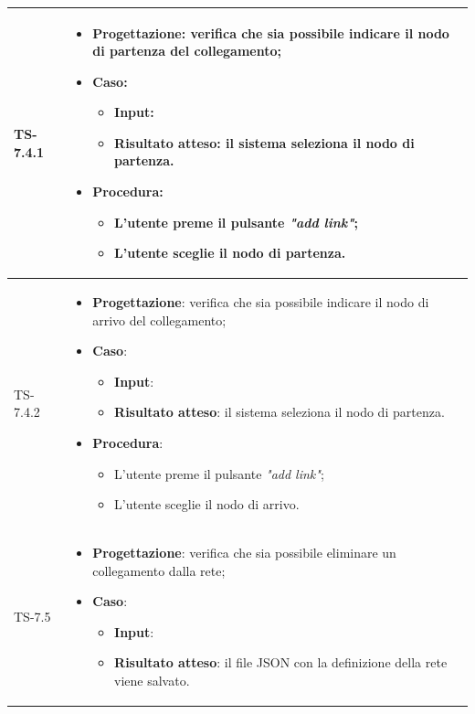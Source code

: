\begin{longtable}{|C{2.5cm}|C{13cm}|}
\hline
	{TS-7.4.1} & 
\begin{itemize}
	\item \textbf{Progettazione}: verifica che sia possibile indicare il nodo
	di partenza del collegamento;
	\item \textbf{Caso}: 
	\begin{itemize}
		\item \textbf{Input}: 
		\item \textbf{Risultato atteso}: il sistema seleziona il nodo di partenza.
	\end{itemize}
	\item \textbf{Procedura}:
	\begin{itemize}
		\item L'utente preme il pulsante \emph{"add link"};
		\item L'utente sceglie il nodo di partenza.
	\end{itemize} 
\end{itemize}
	 \\
	\hline
	{TS-7.4.2} &
\begin{itemize}
	\item \textbf{Progettazione}: verifica che sia possibile indicare il nodo
	di arrivo del collegamento;
	\item \textbf{Caso}: 
	\begin{itemize}
		\item \textbf{Input}: 
		\item \textbf{Risultato atteso}: il sistema seleziona il nodo di partenza.
	\end{itemize}
	\item \textbf{Procedura}:
	\begin{itemize}
		\item L'utente preme il pulsante \emph{"add link"};
		\item L'utente sceglie il nodo di arrivo.
	\end{itemize} 
\end{itemize}
\\
\hline
	{TS-7.5} &
\begin{itemize}
	\item \textbf{Progettazione}: verifica che sia possibile eliminare un
	collegamento dalla rete;
	\item \textbf{Caso}: 
	\begin{itemize}
		\item \textbf{Input}:
		\item \textbf{Risultato atteso}: il file JSON con la definizione della rete viene salvato.

\end{itemize}
\end{itemize}
\end{longtable}
